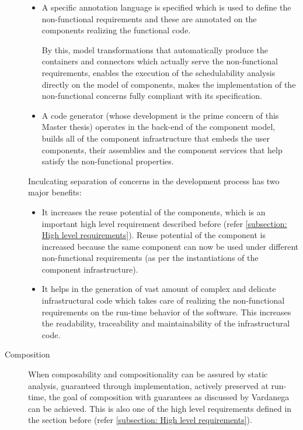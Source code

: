 \begin{description}
\begin{itemize}
\item A specific annotation language is specified which is used to define the non-functional requirements and these are annotated on the components realizing the functional code.

By this, model transformations that automatically produce the containers and connectors which actually serve the non-functional requirements, enables the execution of the schedulability analysis directly on the model of components, makes the implementation of the non-functional concerns fully compliant with its specification. 

\item A code generator (whose development is the prime concern of this Master thesis) operates in the back-end of the component model, builds all of the component infrastructure that embeds the user components, their assemblies and the component services that help satisfy the non-functional properties. 
\end{itemize}

Inculcating separation of concerns in the development process has two major benefits:

\begin{itemize}
\item It increases the reuse potential of the components, which is an important high level requirement described before (refer \cref{subsection: High level requirements}). Reuse potential of the component is increased because the same component can now be used under different non-functional requirements (as per the instantiations of the component infrastructure).

\item It helps in the generation of vast amount of complex and delicate infrastructural code which takes care of realizing the non-functional requirements on the run-time behavior of the software. This increases the readability, traceability and maintainability of the infrastructural code. 
\end{itemize}

\item [Composition] 
\label{section: Founding principle-Composition}
When composability and compositionality can be assured by static analysis, guaranteed through implementation, actively preserved at run-time, the goal of composition with guarantees as discussed by Vardanega can be achieved. This is also one of the high level requirements defined in the section before (refer \cref {subsection: High level requirements}).
 

\end{description}

